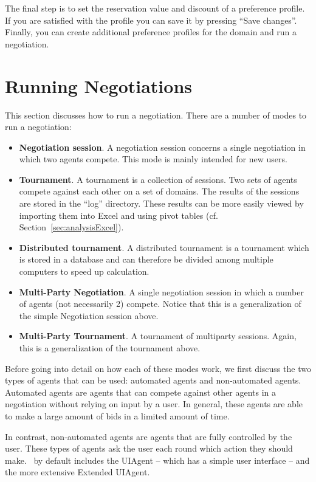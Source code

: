 \documentclass[]{article}
\begin{document}
The final step is to set the reservation value and discount of a preference profile. If you are satisfied with the profile you can save it by pressing ``Save changes''. Finally, you can create additional preference profiles for the domain and run a negotiation.


\section{Running Negotiations}
This section discusses how to run a negotiation. There are a number of modes to run a negotiation:

\begin{itemize}
	\item \textbf{Negotiation session}. A negotiation session concerns a single negotiation in which two agents compete. This mode is mainly intended for new users.
	\item \textbf{Tournament}. A tournament is a collection of sessions. Two sets of agents compete against each other on a set of domains. The results of the sessions are stored in the ``log'' directory. These results can be more easily viewed by importing them into Excel and using pivot tables (cf. Section~\ref{sec:analysisExcel}).
	\item \textbf{Distributed tournament}. A distributed tournament is a tournament which is stored in a database and can therefore be divided among multiple computers to speed up calculation.
	\item \textbf{Multi-Party Negotiation}. A single negotiation session in which a number of agents (not necessarily 2) compete. Notice that this is a generalization of the simple Negotiation session above.
	\item \textbf{Multi-Party Tournament}. A tournament of multiparty sessions. Again, this is a generalization of the tournament above.
	
\end{itemize}

Before going into detail on how each of these modes work, we first discuss the two types of agents that can be used: automated agents and non-automated agents. Automated agents are agents that can compete against other agents in a negotiation without relying on input by a user. In general, these agents are able to make a large amount of bids in a limited amount of time.

In contrast, non-automated agents are agents that are fully controlled by the user. These types of agents ask the user each round which action they should make. \Genius~by default includes the UIAgent -- which has a simple user interface -- and the more extensive Extended UIAgent.
\end{document}

